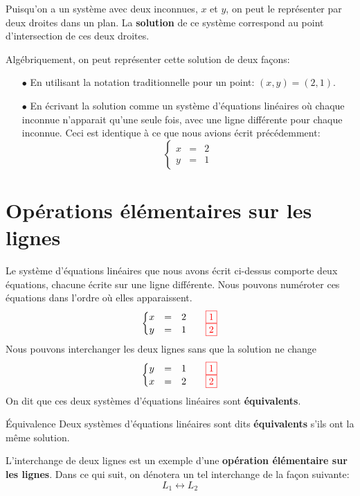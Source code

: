 Puisqu'on a un système avec deux inconnues, $x$ et $y$, on
peut le représenter par deux droites dans un plan.
La \textbf{solution} de ce système correspond au point
d'intersection de ces deux droites.

Algébriquement, on peut représenter cette solution de deux
façons:
\begin{itemize}
\item[$\bullet$] En utilisant la notation traditionnelle
pour un point: $(x, y) = (2, 1)$.
\item[$\bullet$] En écrivant la solution comme un système
d'équations linéaires où chaque inconnue n'apparait qu'une
seule fois, avec une ligne différente pour chaque inconnue. 
Ceci est identique à ce que nous avions écrit précédemment:
\[
\left\{
\begin{matrix}
    x &=& 2\\
    y &=& 1
\end{matrix}
\right.
\]
\end{itemize}

\section{Opérations élémentaires sur les lignes}

Le système d'équations linéaires que nous avons écrit
ci-dessus comporte deux équations, chacune écrite sur
une ligne différente. Nous pouvons numéroter ces équations
dans l'ordre où elles apparaissent.
\[
\left\{
\begin{matrix}
    x &=& 2\qquad {\scriptstyle\color{red}\fbox{1}}\\
    y &=& 1 \qquad {\scriptstyle\color{red}\fbox{2}}
\end{matrix}
\right.
\]
Nous pouvons interchanger les deux lignes sans que 
la solution ne change
\[
\left\{
\begin{matrix}
    y &=& 1\qquad {\scriptstyle\color{red}\fbox{1}}\\
    x &=& 2 \qquad {\scriptstyle\color{red}\fbox{2}}
\end{matrix}
\right.
\]
On dit que ces deux systèmes d'équations linéaires
sont \textbf{équivalents}.
\begin{TrueDef}{Équivalence}
Deux systèmes d'équations linéaires sont dits \textbf{équivalents} s'ils ont la même solution.
\end{TrueDef}
L'interchange de deux lignes est un exemple
d'une \textbf{opération élémentaire sur les lignes}.
Dans ce qui suit, on dénotera un tel interchange
de la façon suivante:
\[
L_1 \leftrightarrow L_2
\]

